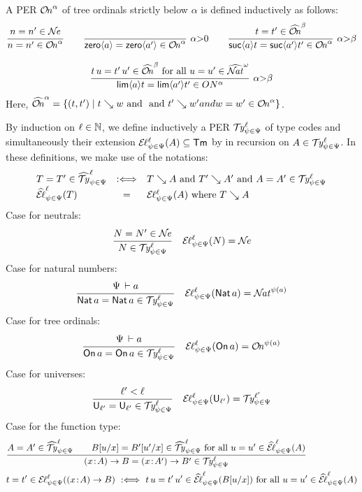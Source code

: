 \documentclass[acmsmall,screen]{acmart}\settopmatter{}
\begin{document}
A PER ${\mathcal{O}\!\mathit{n}}^\alpha$ of tree ordinals strictly below $\alpha$
is defined inductively as follows:
\begin{gather*}
  \ru{n = n' \in \NE
    }{n = n' \in \ON^\alpha}
\qquad
  \rux{
     }{\zero a = \zero{a'} \in \ON^{\alpha}
     }{\alpha {>} 0}
\qquad
  \rux{t = t' \in \ONhat^{\beta}
     }{\suc a t = \suc{a'}{t'} \in \ON^{\alpha}
     }{\alpha {>} \beta}
\\[2ex]
  \rux{t\,u = t'\,u' \in \ONhat^{\beta} \mforall u = u' \in \NAThat^\omega
     }{\lim a t = \lim{a'}{t'} \in ON^{\alpha}
     }{\alpha{>}\beta}
\end{gather*}
Here,
$\widehat{{\mathcal{O}\!\mathit{n}}}^\alpha  = \{ (t,t') \mid t \searrow w \ \mbox{and}\  \ \mbox{and}\  t' \searrow
w' and w = w' \in {\mathcal{O}\!\mathit{n}}^\alpha \}$.


By induction on $\ell \in \mathbb{N}$, we define inductively a PER
$\mathcal{T}\kern-0.4ex\mathit{y}^{\ell}_{\psi\in\Psi}$ of type codes and simultaneously their extension
$\mathcal{E}\kern-0.2ex\ell^{\ell}_{\psi\in\Psi}(A) \subseteq \mathsf{Tm}$ by in recursion on
$A \in \mathcal{T}\kern-0.4ex\mathit{y}^{\ell}_{\psi\in\Psi}$.
In these definitions, we make use of the notations:
\[
\begin{array}{lcl}
  T = T' \in \widehat{\mathcal{T}\kern-0.4ex\mathit{y}}^{\ell}_{\psi\in\Psi}
    & \mathrel{:\Longleftrightarrow} & T \searrow A \ \mbox{and}\  T' \searrow A' \ \mbox{and}\  A = A' \in \mathcal{T}\kern-0.4ex\mathit{y}^{\ell}_{\psi\in\Psi}
\\
  \widehat{\mathcal{E}\kern-0.2ex\ell}^{\ell}_{\psi\in\Psi}(T)
    & = & \mathcal{E}\kern-0.2ex\ell^{\ell}_{\psi\in\Psi}(A) \ \mbox{where}\  T \searrow A
\end{array}
\]
Case for neutrals:
\begin{align*}
  & \ru{N = N' \in \NE}{N \in \TY \Psi \psi \ell}
  &
  \EL \Psi \psi \ell N = \NE
\end{align*}
Case for natural numbers:
\begin{align*}
  & \ru{\Psi \der a
      }{\Nat a = \Nat a \in \TY \Psi \psi \ell}
  & \EL \Psi \psi \ell {\Nat a}
    = \NAT^{\psi(a)}
\end{align*}
Case for tree ordinals:
\begin{align*}
  & \ru{\Psi \der a
      }{\On a = \On a \in \TY \Psi \psi \ell}
  & \EL \Psi \psi \ell {\On a}
    = \ON^{\psi(a)}
\end{align*}
Case for universes:
\begin{align*}
  & \ru{\ell' < \ell
      }{\Univ{\ell'} = \Univ{\ell'} \in \TY \Psi \psi \ell}
  & \EL \Psi \psi \ell{\Univ{\ell'}}
    =
    \TY \Psi \psi {\ell'}
\end{align*}
Case for the function type:
\begin{align*}
  & \ru{A = A' \in \TYhat \Psi \psi \ell \qquad
        \subst u x B = \subst{u'}x{B'} \in \TYhat \Psi \psi \ell
        \mforall u = u' \in \ELhat \Psi \psi \ell A
      }{\funT x A B = \funT x {A'} {B'} \in \TY \Psi \psi \ell}
\\
  & t = t' \in \EL \Psi \psi \ell {\funT x A B}
    \defas
    t\,u = t'\,u' \in \ELhat \Psi \psi \ell {\subst u x B}
    \mforall u = u' \in \ELhat \Psi \psi \ell A
\\
\end{align*}
\end{document}
